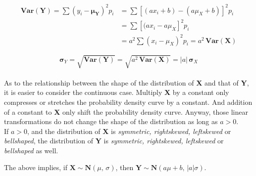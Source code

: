 \documentclass[a4paper, 12pt,twoside]{book}
\begin{document}
          \begin{equation*}
     \begin{split}
    \textbf{Var}(\textbf{Y}) = \sum (y_i-\mathbf{\mu_Y})^2p_i
                             &= \sum [(ax_i+b)-(a\mu_X + b)]^2p_i\\
                             &= \sum [(ax_i- a\mu_X]^2p_i\\
                             &= a^2\sum(x_i- \mu_X)^2p_i = a^2\, \textbf{Var}(\textbf{X})                                 
     \end{split}
     \end{equation*}
     \vspace{0.3cm}
     
     $$\mathbf{\sigma}_Y = \sqrt{\textbf{Var}(\textbf{Y})}= \sqrt{a^2\, \textbf{Var}(\textbf{X})} = |a|\, \mathbf{\sigma}_X$$
     \vspace{0.3cm}\\
      
   As to the relationship between the shape of the distribution of \textbf{X}  and that of \textbf{Y}, it is easier to consider the continuous case. Multiply \textbf{X} by a constant only compresses or stretches the probability density curve by a constant. And addition of a constant to \textbf{X} only shift the probability density curve. Anyway, those linear transformations do not change the shape of the distribution as long as $a>0$.
   \vspace{0.3cm}\\
If $a>0$, and the distribution of \textbf{X} is \textit{symmetric, right\textendash skewed, left\textendash skewed} or \textit{bell\textendash shaped}, the distribution of \textbf{Y} is \textit{symmetric, right\textendash skewed, left\textendash skewed} or \textit{bell\textendash shaped} as well.
\vspace{0.3cm}\\

\colorbox{babypink}{\parbox{0.9\textwidth}{
The above implies, if $\textbf{X}\sim \textbf{N}(\mu,\, \sigma)$, then $\textbf{Y}\sim \textbf{N}(a\mu+b,\, |a|\sigma)$.
}}
\newpage
\end{document}
